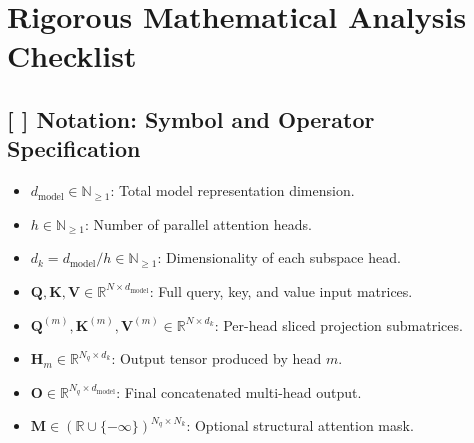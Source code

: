 \documentclass[11pt,a4paper]{article}
\theoremstyle{definition}
\begin{document}
\section{Rigorous Mathematical Analysis Checklist}

\subsection{[ ] Notation: Symbol and Operator Specification}
\begin{itemize}
    \item $d_{\text{model}} \in \mathbb{N}_{\ge 1}$: Total model representation dimension.
    \item $h \in \mathbb{N}_{\ge 1}$: Number of parallel attention heads.
    \item $d_k = d_{\text{model}} / h \in \mathbb{N}_{\ge 1}$: Dimensionality of each subspace head.
    \item $\mathbf{Q}, \mathbf{K}, \mathbf{V} \in \mathbb{R}^{N \times d_{\text{model}}}$: Full query, key, and value input matrices.
    \item $\mathbf{Q}^{(m)}, \mathbf{K}^{(m)}, \mathbf{V}^{(m)} \in \mathbb{R}^{N \times d_k}$: Per-head sliced projection submatrices.
    \item $\mathbf{H}_m \in \mathbb{R}^{N_q \times d_k}$: Output tensor produced by head $m$.
    \item $\mathbf{O} \in \mathbb{R}^{N_q \times d_{\text{model}}}$: Final concatenated multi-head output.
    \item $\mathbf{M} \in (\mathbb{R} \cup \{-\infty\})^{N_q \times N_k}$: Optional structural attention mask.
\end{itemize}
\end{document}
